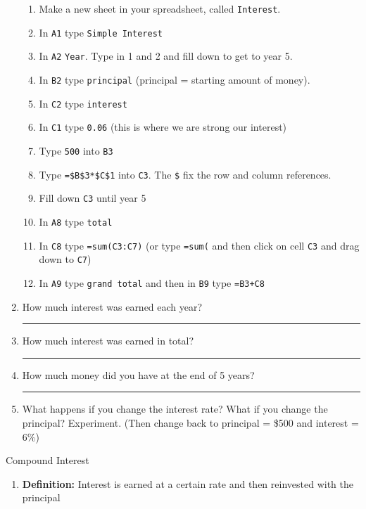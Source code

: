 \documentclass[12pt]{article}
\newcommand{\ans}[1][1in]{\rule{#1}{.5pt}}
\newcommand{\be}{\begin{enumerate}}
\newcommand{\ee}{\end{enumerate}}
\begin{document}
\begin{enumerate}
%
\be
\item Make a new sheet in your spreadsheet, called \verb`Interest`.
\item In \verb`A1` type \verb`Simple Interest`
\item In \verb`A2` \verb`Year`. Type in 1 and 2 and fill down to get to year 5.
\item In \verb`B2` type \verb`principal` (principal = starting amount of money).
\item In \verb `C2` type  \verb`interest`
\item In \verb `C1` type \verb`0.06` (this is where we are strong our interest)
\item Type \verb`500` into \verb`B3`
\item Type \verb`=$B$3*$C$1` into \verb`C3`. The \verb`$` fix the row and column references.
\item Fill down \verb`C3` until year 5
\item In \verb`A8` type \verb`total`
\item In \verb`C8` type \verb`=sum(C3:C7)` (or type \verb`=sum(` and then click on cell \verb`C3` and drag down to \verb`C7`) 
\item In \verb`A9` type \verb`grand total` and then in \verb`B9` type \verb`=B3+C8`
\ee

\item How much interest was earned each year? \ans

\item How much interest was earned in total? \ans

\item How much money did you have at the end of 5 years? \ans

\item What happens if you change the interest rate? What if you change the principal? Experiment. (Then change back to principal = \$500 and interest = 6\%)

\ee
\newpage

\item Compound Interest
\be

\item {\bf Definition:} Interest is earned at a certain rate and then reinvested with the principal


\end{enumerate}
\end{document}
